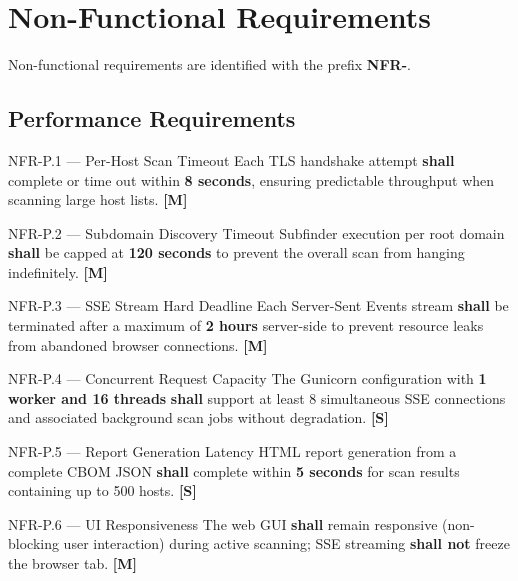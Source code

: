 \chapter{Non-Functional Requirements}
\label{chap:nonfunctional}

Non-functional requirements are identified with the prefix \textbf{NFR-}.

\section{Performance Requirements}
\label{sec:perf}

\begin{reqbox}{NFR-P.1 — Per-Host Scan Timeout}
  Each TLS handshake attempt \textbf{shall} complete or time out within
  \textbf{8 seconds}, ensuring predictable throughput when scanning large host
  lists. \hfill \textbf{[M]}
\end{reqbox}

\begin{reqbox}{NFR-P.2 — Subdomain Discovery Timeout}
  Subfinder execution per root domain \textbf{shall} be capped at
  \textbf{120 seconds} to prevent the overall scan from hanging indefinitely.
  \hfill \textbf{[M]}
\end{reqbox}

\begin{reqbox}{NFR-P.3 — SSE Stream Hard Deadline}
  Each Server-Sent Events stream \textbf{shall} be terminated after a maximum
  of \textbf{2 hours} server-side to prevent resource leaks from abandoned
  browser connections. \hfill \textbf{[M]}
\end{reqbox}

\begin{reqbox}{NFR-P.4 — Concurrent Request Capacity}
  The Gunicorn configuration with \textbf{1 worker and 16 threads}
  \textbf{shall} support at least 8 simultaneous SSE connections and
  associated background scan jobs without degradation. \hfill \textbf{[S]}
\end{reqbox}

\begin{reqbox}{NFR-P.5 — Report Generation Latency}
  HTML report generation from a complete CBOM JSON \textbf{shall} complete
  within \textbf{5 seconds} for scan results containing up to 500 hosts.
  \hfill \textbf{[S]}
\end{reqbox}

\begin{reqbox}{NFR-P.6 — UI Responsiveness}
  The web GUI \textbf{shall} remain responsive (non-blocking user interaction)
  during active scanning; SSE streaming \textbf{shall not} freeze the browser tab.
  \hfill \textbf{[M]}
\end{reqbox}

